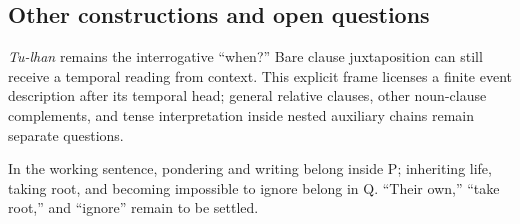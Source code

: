 \subsection*{Other constructions and open questions}

\textit{Tu-lhan} remains the interrogative ``when?'' Bare clause juxtaposition can still receive a temporal reading from context. This explicit frame licenses a finite event description after its temporal head; general relative clauses, other noun-clause complements, and tense interpretation inside nested auxiliary chains remain separate questions.

In the working sentence, pondering and writing belong inside P; inheriting life, taking root, and becoming impossible to ignore belong in Q. ``Their own,'' ``take root,'' and ``ignore'' remain to be settled.
